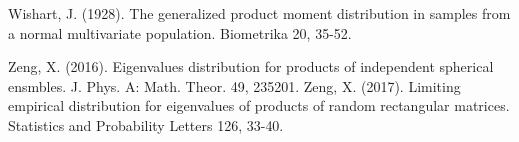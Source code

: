 \documentclass[12pt]{article}
\theoremstyle{plain}
\theoremstyle{definition}
\theoremstyle{remark}
\begin{document}
\begin{thebibliography}{n}
  Wishart, J. (1928). The generalized product moment distribution in samples from a normal multivariate population. Biometrika 20, 35-52.

Zeng, X. (2016). Eigenvalues distribution for products of independent spherical ensmbles. J. Phys. A: Math. Theor. 49, 235201.
Zeng, X. (2017). Limiting empirical distribution for eigenvalues of products of random rectangular matrices. Statistics and Probability Letters 126, 33-40.






\end{thebibliography}
\end{document}
